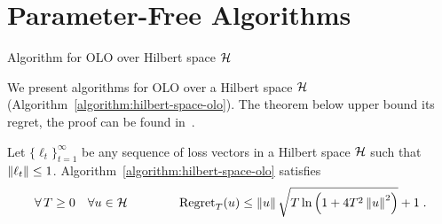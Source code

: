 \section{Parameter-Free Algorithms}
\label{sec:algos}

\begin{algorithm}[t]
\caption{Algorithm for OLO over Hilbert space $\mathcal{H}$
\label{algorithm:hilbert-space-olo}}
\begin{algorithmic}[1]
{
\ENDFOR
}
\end{algorithmic}
\end{algorithm}
%
%

We present algorithms for \ac{OLO} over a Hilbert space $\mathcal{H}$
(Algorithm~\ref{algorithm:hilbert-space-olo}).
The theorem below upper bound its regret, the proof can be found in~\cite{Orabona-Pal-2016-parameter-free}.

\begin{theorem}
\label{theorem:hilbert-space-olo-regret}
Let $\{\ell_t\}_{t=1}^\infty$ be any sequence of loss vectors
in a Hilbert space $\mathcal{H}$ such that $\left\|{\ell_t}\right\| \le 1$.
Algorithm~\ref{algorithm:hilbert-space-olo} satisfies
$$
\forall \, T \ge 0 \quad
\forall u \in \mathcal{H} \qquad \qquad
\operatorname{Regret}_T(u) \le \left\|{u}\right\| \sqrt{T \ln\left(1 + 4T^2 \left\|{u}\right\|^2 \right)} + 1 \;.
$$
\end{theorem}

